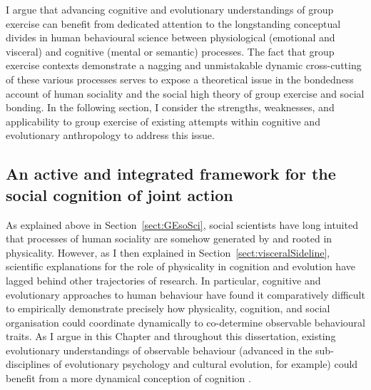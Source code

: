 \begin{CJK}{UTF8}{gbsn}
I argue that advancing cognitive and evolutionary understandings of group exercise can benefit from dedicated attention to the longstanding conceptual divides in human behavioural science between physiological (emotional and visceral) and cognitive (mental or semantic) processes.   The fact that group exercise contexts demonstrate a nagging and unmistakable dynamic cross-cutting of these various processes serves to expose a theoretical issue in the bondedness account of human sociality and the social high theory of group exercise and social bonding.  In the following section, I consider the strengths, weaknesses, and applicability to group exercise of existing attempts within cognitive and evolutionary anthropology to address this issue.






\subsection{An active and integrated framework for the social cognition of joint action\label{sect:AIFsoCoJA}}
As explained above in Section~\ref{sect:GEsoSci}, social scientists have long intuited that processes of human sociality are somehow generated by and rooted in physicality.  However, as I then explained in Section~\ref{sect:visceralSideline}, scientific explanations for the role of physicality in cognition and evolution have lagged behind other trajectories of research.  In particular, cognitive and evolutionary approaches to human behaviour have found it comparatively difficult to empirically demonstrate precisely how physicality, cognition, and social organisation could coordinate dynamically to co-determine observable behavioural traits.  As I argue in this Chapter and throughout this dissertation, existing evolutionary understandings of observable behaviour (advanced in the sub-disciplines of evolutionary psychology and cultural evolution, for example) could benefit from a more dynamical conception of cognition \citep{Kenrick2001,Badcock2012,Ramstead2017}.


\end{CJK}
